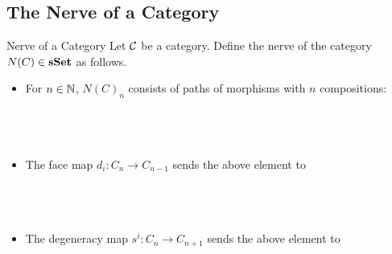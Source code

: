\documentclass[a4paper]{article}
\begin{document}
\subsection{The Nerve of a Category}
\begin{defn}{Nerve of a Category}{} Let $\mathcal{C}$ be a category. Define the nerve of the category $N(C)\in\bold{sSet}$ as follows. 
\begin{itemize}
\item For $n\in\mathbb{N}$, $N(C)_n$ consists of paths of morphisms with $n$ compositions: \\~\\
\\~\\
\item The face map $d_i:C_n\to C_{n-1}$ sends the above element to \\~\\
\\~\\
\item The degeneracy map $s^i:C_n\to C_{n+1}$ sends the above element to 
\end{itemize}
\end{defn}
\end{document}
